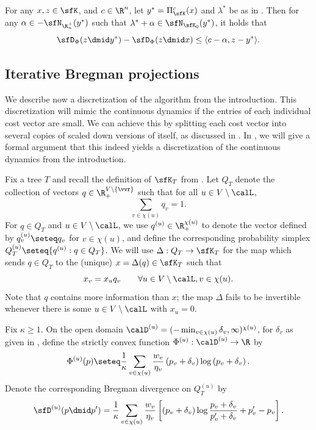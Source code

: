 \begin{lemma}\label{lem:bp}
	For any $x, z \in \sfK$, and $c \in \R^n$, let $y^* = \Pi_{\sfK}^c(x)$ and $\lambda^*$
	be as in .
	Then for any $\alpha \in -\sfN_{\R^+_n}(y^*)$ such that $\lambda^* + \alpha \in \sfN_{\sfK_0}(y^*)$,
	it holds that
	\[
	\sfD_{\Phi}(z \dmid y^*) - \sfD_{\Phi}(z \dmid x) \leq \langle c-\alpha, z-y^*\rangle.
	\]
\end{lemma}

\subsection{Iterative Bregman projections}
\label{sec:iter}

We describe now a discretization of the algorithm from the introduction. This discretization will mimic the continuous dynamics if the entries of each individual cost vector are small. We can achieve this by splitting each cost vector into several copies of scaled down versions of itself, as discussed in . In , we will give a formal argument that this indeed yields a discretization of the continuous dynamics from the introduction.

Fix a tree $T$ and recall the definition of $\sfK_T$ from .
Let $Q_{T}$ denote the collection of vectors $q \in \R_+^{V \setminus \{\vvr\}}$ such that
for all $u \in V \setminus \calL$,
\[
\sum_{v \in \chi(u) } q_v = 1.
\]
For $q \in Q_T$ and $u \in V \setminus \calL$, we use $q^{(u)} \in \R_+^{\chi(u)}$ to denote the vector
defined by $q^{(u)}_v \seteq q_v$ for $v \in \chi(u)$, and define
the corresponding probability simplex
$Q^{(u)}_T \seteq \{ q^{(u)} : q \in Q_T \}$.
We will use $\Delta : Q_T \to \sfK_T$ for the map which sends $q \in Q_T$ to the (unique) $x = \Delta(q) \in \sfK_T$ such that
\[
x_v = x_u q_v \qquad \forall u \in V \setminus \calL, v \in \chi(u).
\]
Note that $q$ contains more information than $x$; the map $\Delta$ fails to be invertible whenever 
there is some $u \in V \setminus \calL$ with $x_u = 0$.

Fix $\kappa \ge 1$. On the open domain $\calD^{(u)}=(-\min_{v\in\chi(u)}\delta_v,\infty)^{\chi(u)}$, for $\delta_v$ as given in , define the strictly convex function $\Phi^{(u)} : \calD^{(u)} \to \R$ by
\[
\Phi^{(u)}(p) \seteq \frac{1}{\kappa} \sum_{v \in \chi(u)} \frac{w_v}{\eta_v} \left(p_v + \delta_v\right) \log \left(p_v + \delta_v\right).
\]
Denote the corresponding Bregman divergence on $Q^{(u)}_T$ by
\[
\sfD^{(u)}\!\left(p \dmid p' \right) = \frac{1}{\kappa} \sum_{v \in \chi(u)} \frac{w_v}{\eta_v} \left[\left(p_v + \delta_v\right) \log \frac{p_v+\delta_v}{p'_v+\delta_v}
+ p'_v-p_v\right].
\]


